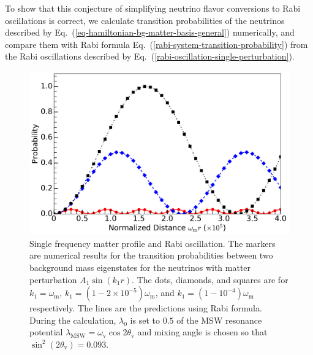 \documentclass[%
reprint,
 amsmath,amssymb,
 prd,
]{revtex4-1}
\begin{document}

To show that this conjecture of simplifying neutrino flavor conversions to Rabi oscillations is correct, we calculate transition probabilities of the neutrinos described by Eq.~(\ref{eq-hamiltonian-bg-matter-basis-general}) numerically, and compare them with Rabi formula Eq.~(\ref{rabi-system-transition-probability}) from the Rabi oscillations described by Eq.~(\ref{rabi-oscillation-single-perturbation}).




\begin{figure}
                \includegraphics[width=\columnwidth]{assets/rabiOscillationsNeutrinoCoincidence-single-frequency}
                \caption{Single frequency matter profile and Rabi oscillation. The markers are numerical results for the transition probabilities between two background mass eigenstates for the neutrinos with matter perturbation $A_1\sin(k_1 r)$. The dots, diamonds, and squares are for $k_1=\omega_{\mathrm m}$, $k_1=(1-2\times 10^{-5})\omega_{\mathrm m}$, and $k_1=(1-10^{-4})\omega_{\mathrm m}$ respectively. The lines are the predictions using Rabi formula. During the calculation, $\lambda_0$ is set to $0.5$ of the MSW resonance potential $\lambda_{\mathrm{MSW}}=\omega_{\mathrm{v}}\cos 2\theta_{\mathrm v}$ and mixing angle is chosen so that $\sin^2(2\theta_{\mathrm v}) = 0.093$.}
                \label{fig-rabiOscillationsNeutrinoCoincidence}
\end{figure}
\end{document}
